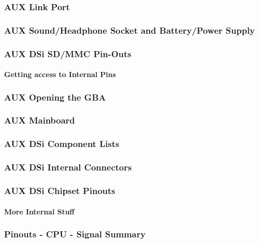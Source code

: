 \documentclass[11pt,a4paper]{proc}
\begin{document}
\begin{flushleft}
\subsubsection{AUX Link Port}

\subsubsection{AUX Sound/Headphone Socket and Battery/Power Supply}

\subsubsection{AUX DSi SD/MMC Pin-Outs}

\paragraph{Getting access to Internal Pins}

\subsubsection{AUX Opening the GBA}

\subsubsection{AUX Mainboard}

\subsubsection{AUX DSi Component Lists}

\subsubsection{AUX DSi Internal Connectors}

\subsubsection{AUX DSi Chipset Pinouts}

\paragraph{More Internal Stuff}

\subsubsection{Pinouts - CPU - Signal Summary}


\end{flushleft}
\end{document}
